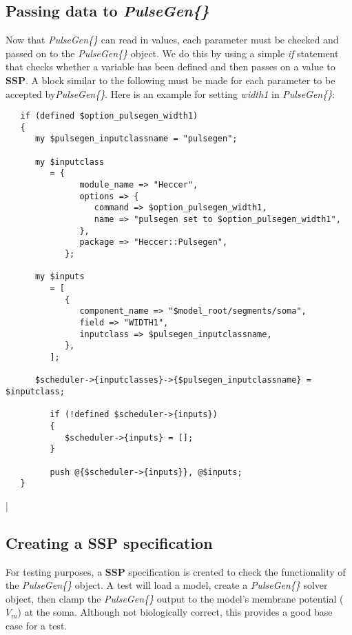 \documentclass[12pt]{article}
\begin{document}
\subsection*{Passing data to {\it PulseGen\{\}}}

Now that {\it PulseGen\{\}} can read in values, each parameter must be checked and passed on to the {\it PulseGen\{\}} object. We do this by using a simple {\it if} statement that checks whether a variable has been defined and then passes on a value to {\bf SSP}. A block similar to the following must be made for each parameter to be accepted by{\it PulseGen\{\}}. Here is an example for setting {\it width1} in {\it PulseGen\{\}}:
\begin{verbatim}
   if (defined $option_pulsegen_width1)
   {
      my $pulsegen_inputclassname = "pulsegen";

      my $inputclass
         = {
               module_name => "Heccer",
               options => {
                  command => $option_pulsegen_width1,
                  name => "pulsegen set to $option_pulsegen_width1",
               },
               package => "Heccer::Pulsegen",
            };

      my $inputs
         = [
            {
               component_name => "$model_root/segments/soma",
               field => "WIDTH1",
               inputclass => $pulsegen_inputclassname,
            },
         ];

      $scheduler->{inputclasses}->{$pulsegen_inputclassname} = $inputclass;

         if (!defined $scheduler->{inputs})
         {
            $scheduler->{inputs} = [];
         }

         push @{$scheduler->{inputs}}, @$inputs;
   }
\end{verbatim}

|\subsection*{Creating a SSP specification}

For testing purposes, a {\bf SSP} specification is created to check the functionality of the {\it PulseGen\{\}} object. A test will load a model, create a {\it PulseGen\{\}} solver object, then clamp the {\it PulseGen\{\}} output to the model's membrane potential ($V_m$) at the soma. Although not biologically correct, this provides a good base case for a test.
\end{document}

